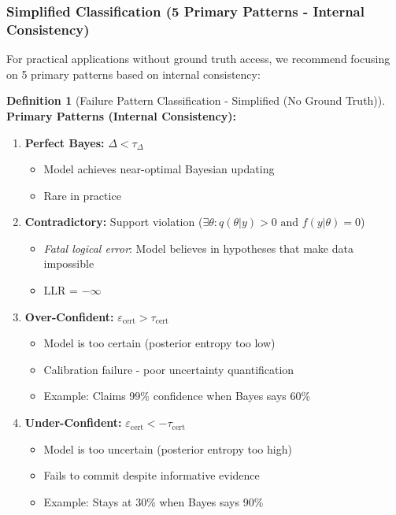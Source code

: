 \documentclass{article}
\theoremstyle{definition}
\newtheorem{definition}{Definition}
\begin{document}
\subsubsection{Simplified Classification (5 Primary Patterns - Internal Consistency)}

For practical applications without ground truth access, we recommend focusing on 5 primary patterns based on internal consistency:

\begin{definition}[Failure Pattern Classification - Simplified (No Ground Truth)]
\textbf{Primary Patterns (Internal Consistency):}
\begin{enumerate}
    \item \textbf{Perfect Bayes:} $\Delta < \tau_{\Delta}$
    \begin{itemize}
        \item Model achieves near-optimal Bayesian updating
        \item Rare in practice
    \end{itemize}

    \item \textbf{Contradictory:} Support violation ($\exists \theta: q(\theta|y) > 0 \text{ and } f(y|\theta) = 0$)
    \begin{itemize}
        \item \emph{Fatal logical error}: Model believes in hypotheses that make data impossible
        \item LLR = $-\infty$
    \end{itemize}

    \item \textbf{Over-Confident:} $\varepsilon_{\text{cert}} > \tau_{\text{cert}}$
    \begin{itemize}
        \item Model is too certain (posterior entropy too low)
        \item Calibration failure - poor uncertainty quantification
        \item Example: Claims 99\% confidence when Bayes says 60\%
    \end{itemize}

    \item \textbf{Under-Confident:} $\varepsilon_{\text{cert}} < -\tau_{\text{cert}}$
    \begin{itemize}
        \item Model is too uncertain (posterior entropy too high)
        \item Fails to commit despite informative evidence
        \item Example: Stays at 30\% when Bayes says 90\%
    \end{itemize}


\end{enumerate}
\end{definition}
\end{document}
